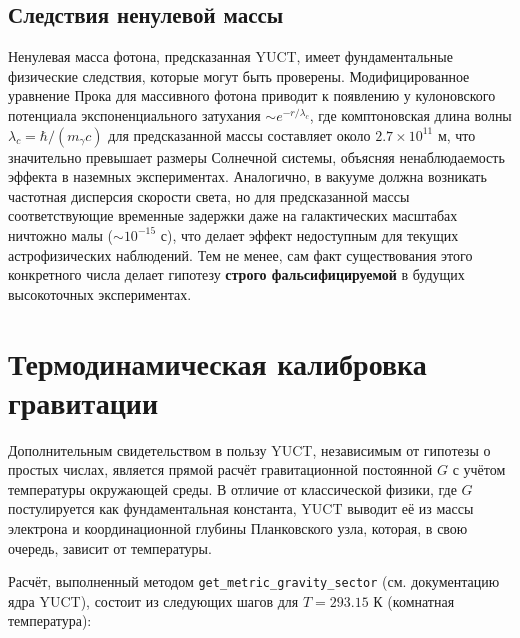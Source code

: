 \documentclass[11pt,a4paper]{article}
\begin{document}
	\subsection{Следствия ненулевой массы}
	Ненулевая масса фотона, предсказанная YUCT, имеет фундаментальные физические следствия, которые могут быть проверены. Модифицированное уравнение Прока для массивного фотона \cite{Proca1936} приводит к появлению у кулоновского потенциала экспоненциального затухания $\sim e^{-r/\lambda_c}$, где комптоновская длина волны $\lambda_c = \hbar / (m_\gamma c)$ для предсказанной массы составляет около $2.7 \times 10^{11}$ м, что значительно превышает размеры Солнечной системы, объясняя ненаблюдаемость эффекта в наземных экспериментах. Аналогично, в вакууме должна возникать частотная дисперсия скорости света, но для предсказанной массы соответствующие временные задержки даже на галактических масштабах ничтожно малы ($\sim 10^{-15}$ с), что делает эффект недоступным для текущих астрофизических наблюдений. Тем не менее, сам факт существования этого конкретного числа делает гипотезу \textbf{строго фальсифицируемой} в будущих высокоточных экспериментах.
	
	\section{Термодинамическая калибровка гравитации}
	\label{sec:thermal_gravity}
	
	Дополнительным свидетельством в пользу YUCT, независимым от гипотезы о простых числах, является прямой расчёт гравитационной постоянной $G$ с учётом температуры окружающей среды. В отличие от классической физики, где $G$ постулируется как фундаментальная константа, YUCT выводит её из массы электрона и координационной глубины Планковского узла, которая, в свою очередь, зависит от температуры.
	
	Расчёт, выполненный методом \texttt{get\_metric\_gravity\_sector} (см. документацию ядра YUCT), состоит из следующих шагов для $T = 293.15$ К (комнатная температура):
	
\end{document}
